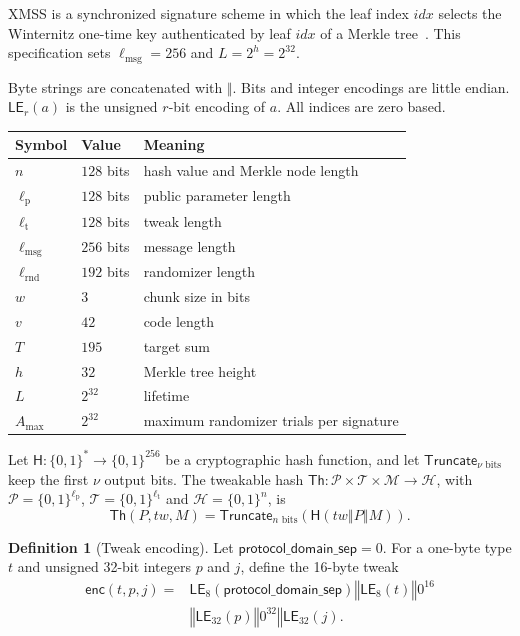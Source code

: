 \documentclass[11pt]{article}
\theoremstyle{definition}
\newtheorem{definition}{Definition}[section]
\theoremstyle{plain}
\theoremstyle{remark}
\newcommand{\bits}[1]{\{0,1\}^{#1}}
\newcommand{\Th}{\mathsf{Th}}
\newcommand{\hash}{\mathsf{H}}
\newcommand{\LE}{\mathsf{LE}}
\newcommand{\Truncate}{\mathsf{Truncate}}
\newcommand{\concat}{\mathbin\Vert}
\newcommand{\idx}{\mathit{idx}}
\newcommand{\tw}{\mathit{tw}}
\newcommand{\lmsg}{\ell_{\mathrm{msg}}}
\newcommand{\lpar}{\ell_{\mathrm{p}}}
\newcommand{\ltwk}{\ell_{\mathrm{t}}}
\newcommand{\lrnd}{\ell_{\mathrm{rnd}}}
\newcommand{\amax}{A_{\max}}
\begin{document}
XMSS is a synchronized signature scheme in which the leaf index $\idx$ selects the Winternitz one-time key authenticated by leaf $\idx$ of a Merkle tree~\cite{RFC8391}. This specification sets $\lmsg=256$ and $L=2^h=2^{32}$.

Byte strings are concatenated with $\concat$. Bits and integer encodings are little endian. $\LE_r(a)$ is the unsigned $r$-bit encoding of $a$. All indices are zero based.

\begin{center}
\begin{tabular}{@{}lll@{}}
\toprule
Symbol & Value & Meaning\\
\midrule
$n$ & $128$ bits & hash value and Merkle node length\\
$\lpar$ & $128$ bits & public parameter length\\
$\ltwk$ & $128$ bits & tweak length\\
$\lmsg$ & $256$ bits & message length\\
$\lrnd$ & $192$ bits & randomizer length\\
$w$ & $3$ & chunk size in bits\\
$v$ & $42$ & code length\\
$T$ & $195$ & target sum\\
$h$ & $32$ & Merkle tree height\\
$L$ & $2^{32}$ & lifetime\\
$\amax$ & $2^{32}$ & maximum randomizer trials per signature\\
\bottomrule
\end{tabular}
\end{center}

Let $\hash:\bits{*}\to\bits{256}$ be a cryptographic hash function, and let $\Truncate_{\nu\text{ bits}}$ keep the first $\nu$ output bits. The tweakable hash $\Th:\mathcal P\times\mathcal T\times\mathcal M\to\mathcal H$, with $\mathcal P=\bits{\lpar}$, $\mathcal T=\bits{\ltwk}$ and $\mathcal H=\bits{n}$, is
\[
  \Th(P,\tw,M)=\Truncate_{n\text{ bits}}\!\left(\hash(\tw\concat P\concat M)\right).
\]

\begin{definition}[Tweak encoding]
Let $\mathsf{protocol\_domain\_sep}=0$. For a one-byte type $t$ and unsigned 32-bit integers $p$ and $j$, define the 16-byte tweak
\[
\begin{aligned}
  \mathsf{enc}(t,p,j)={}&\LE_8(\mathsf{protocol\_domain\_sep})\concat\LE_8(t)\concat0^{16}\\
  &{}\concat\LE_{32}(p)\concat0^{32}\concat\LE_{32}(j).
\end{aligned}
\]
\end{definition}
\end{document}
